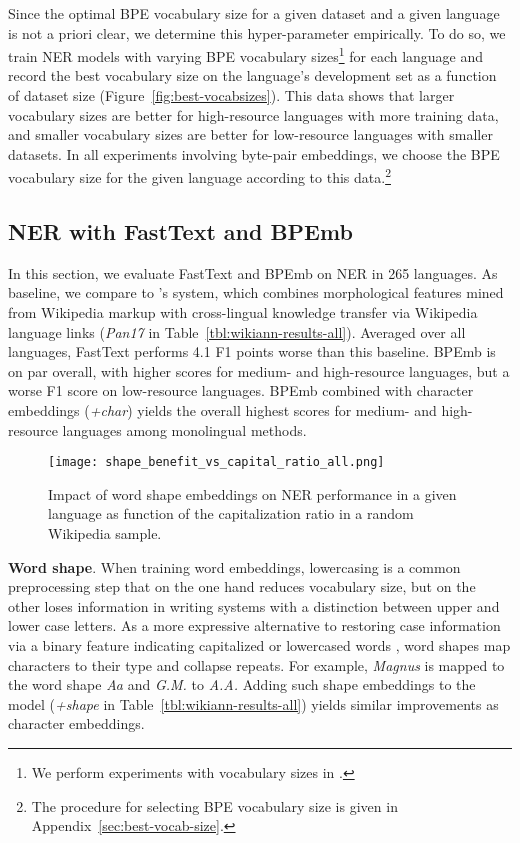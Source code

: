 \documentclass[11pt,a4paper]{article}
\begin{document}
Since the optimal BPE vocabulary size for a given dataset and a given language is not a priori clear, we determine this hyper-parameter empirically.
To do so, we train NER models with varying BPE vocabulary sizes\footnote{We perform experiments with vocabulary sizes in .
	} for each language and record the best vocabulary size on the language's development set as a function of dataset size (Figure~\ref{fig:best-vocabsizes}).
This data shows that larger vocabulary sizes are better for high-resource languages with more training data, and smaller vocabulary sizes are better for low-resource languages with smaller datasets.
In all experiments involving byte-pair embeddings, we choose the BPE vocabulary size for the given language according to this data.\footnote{The procedure for selecting BPE vocabulary size is given in Appendix~\ref{sec:best-vocab-size}.}

\subsection{NER with FastText and BPEmb}
\label{sec:ner-all}

In this section, we evaluate FastText and BPEmb on NER in 265 languages.
As baseline, we compare to \citet{pan2017crosslingual}'s system, which combines morphological features mined from Wikipedia markup with cross-lingual knowledge transfer via Wikipedia language links (\emph{Pan17} in Table~\ref{tbl:wikiann-results-all}).
Averaged over all languages, FastText performs 4.1 F1 points worse than this baseline.
BPEmb is on par overall, with higher scores for medium- and high-resource languages, but a worse F1 score on low-resource languages.
BPEmb combined with character embeddings (\emph{+char}) yields the overall highest scores for medium- and high-resource languages among monolingual methods.

\begin{figure}[t!]
	\centering
	\texttt{[image: shape\_benefit\_vs\_capital\_ratio\_all.png]}
	\caption{Impact of word shape embeddings on NER performance in a given language as function of the capitalization ratio in a random Wikipedia sample.}
	\label{fig:shape-benefit}
\end{figure}
\noindent\textbf{Word shape}. When training word embeddings, lowercasing is a common preprocessing step \citep{pennington2014glove} that on the one hand reduces vocabulary size, but on the other loses information in writing systems with a distinction between upper and lower case letters.
As a more expressive alternative to restoring case information via a binary feature indicating capitalized or lowercased words \cite{curran2003language}, word shapes \citep{collins2002ranking,finkel2005nonlocal} map characters to their type and collapse repeats.
For example, \emph{Magnus} is mapped to the word shape \emph{Aa} and \emph{G.M.} to \emph{A.A.}
Adding such shape embeddings to the model (\emph{+shape} in Table~\ref{tbl:wikiann-results-all}) yields similar improvements as character embeddings.
\end{document}
